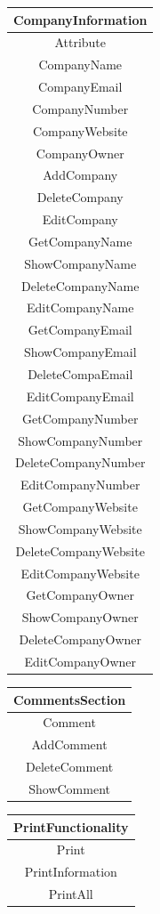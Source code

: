 \begin{center}
\begin{tabular}{ |c| }
\hline
\textbf{CompanyInformation}\\
\hline
Attribute\\
CompanyName\\
CompanyEmail\\
CompanyNumber\\
CompanyWebsite\\
CompanyOwner\\
\hline
AddCompany\\
DeleteCompany\\
EditCompany\\
GetCompanyName\\
ShowCompanyName\\
DeleteCompanyName\\
EditCompanyName\\
GetCompanyEmail\\
ShowCompanyEmail\\
DeleteCompaEmail\\
EditCompanyEmail\\
GetCompanyNumber\\
ShowCompanyNumber\\
DeleteCompanyNumber\\
EditCompanyNumber\\
GetCompanyWebsite\\
ShowCompanyWebsite\\
DeleteCompanyWebsite\\
EditCompanyWebsite\\
GetCompanyOwner\\
ShowCompanyOwner\\
DeleteCompanyOwner\\
EditCompanyOwner\\
\hline
\end{tabular}
\end{center}
\begin{center}
\begin{tabular}{ |c| }
\hline
\textbf{CommentsSection}\\
\hline
Comment\\
\hline
AddComment\\
DeleteComment\\
ShowComment\\
\hline
\end{tabular}
\end{center}
\begin{center}
\begin{tabular}{ |c| }
\hline
\textbf{PrintFunctionality}\\
\hline
Print\\
\hline
PrintInformation\\
PrintAll\\
\hline
\end{tabular}
\end{center}

